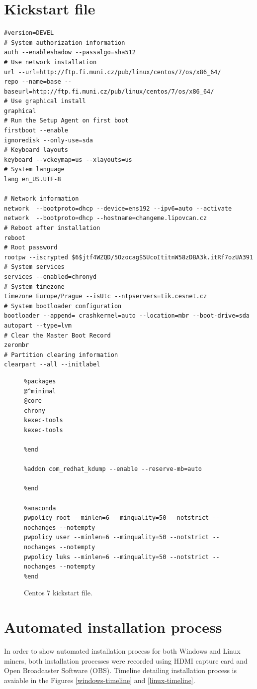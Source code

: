 \documentclass[
  printed, %
  table,   %
  lof,     %
  lot,     %
           oneside, color
]{fithesis3}
\begin{document}
\chapter{Kickstart file}
\label{kickstart}
\begin{lstlisting}
#version=DEVEL
# System authorization information
auth --enableshadow --passalgo=sha512
# Use network installation
url --url=http://ftp.fi.muni.cz/pub/linux/centos/7/os/x86_64/
repo --name=base --baseurl=http://ftp.fi.muni.cz/pub/linux/centos/7/os/x86_64/
# Use graphical install
graphical
# Run the Setup Agent on first boot
firstboot --enable
ignoredisk --only-use=sda
# Keyboard layouts
keyboard --vckeymap=us --xlayouts=us
# System language
lang en_US.UTF-8

# Network information
network  --bootproto=dhcp --device=ens192 --ipv6=auto --activate
network  --bootproto=dhcp --hostname=changeme.lipovcan.cz
# Reboot after installation
reboot
# Root password
rootpw --iscrypted $6$jtf4WZQD/5Ozocag$5UcoItitnW58zDBA3k.itRf7ozUA391
# System services
services --enabled=chronyd
# System timezone
timezone Europe/Prague --isUtc --ntpservers=tik.cesnet.cz
# System bootloader configuration
bootloader --append= crashkernel=auto --location=mbr --boot-drive=sda
autopart --type=lvm
# Clear the Master Boot Record
zerombr
# Partition clearing information
clearpart --all --initlabel
\end{lstlisting}
\newpage
\begin{figure}[H]
\begin{lstlisting}
%packages
@^minimal
@core
chrony
kexec-tools
kexec-tools

%end

%addon com_redhat_kdump --enable --reserve-mb=auto

%end

%anaconda
pwpolicy root --minlen=6 --minquality=50 --notstrict --nochanges --notempty
pwpolicy user --minlen=6 --minquality=50 --notstrict --nochanges --notempty
pwpolicy luks --minlen=6 --minquality=50 --notstrict --nochanges --notempty
%end
\end{lstlisting}


\center
\caption{Centos 7 kickstart file.}
\label{fig:kickstart}
\end{figure}
\chapter{Automated installation process}
In order to show automated installation process for both Windows and Linux miners, both installation processes were recorded using HDMI capture card and Open Broadcaster Software (OBS). Timeline detailing installation process is avaiable in the Figures \ref{windows-timeline} and \ref{linux-timeline}.
\end{document}
